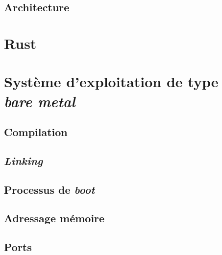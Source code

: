 \documentclass[a4paper]{article}
\begin{document}
\subsection{Architecture}


\section{Rust}


\section{Système d’exploitation de type \textit{bare metal}}
\subsection{Compilation}


\subsection{\textit{Linking}}


\subsection{Processus de \textit{boot}}


\subsection{Adressage mémoire}


\subsection{Ports}

\end{document}
